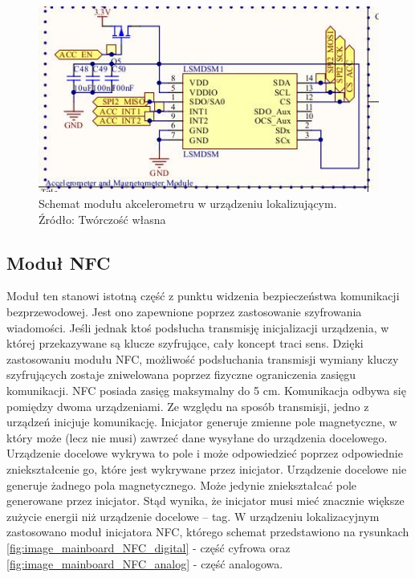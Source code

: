 \begin{figure}[H]
	\centering
	\includegraphics[width=15cm]{img/schematics/mainboard_functional_accelerometer.jpg}
	\caption{Schemat modułu akcelerometru w urządzeniu lokalizującym. \\ Źródło: Twórczość własna}
	\label{fig:image_mainboard_functional_accelerometer}
\end{figure}

\subsection{Moduł NFC}

Moduł ten stanowi istotną część z punktu widzenia bezpieczeństwa komunikacji bezprzewodowej. Jest ono zapewnione poprzez zastosowanie szyfrowania wiadomości. Jeśli jednak ktoś podsłucha transmisję inicjalizacji urządzenia, w której przekazywane są klucze szyfrujące, cały koncept traci sens. Dzięki zastosowaniu modułu NFC, możliwość podsłuchania transmisji wymiany kluczy szyfrujących zostaje zniwelowana poprzez fizyczne ograniczenia zasięgu komunikacji. NFC posiada zasięg maksymalny do 5 cm.
Komunikacja odbywa się pomiędzy dwoma urządzeniami. Ze względu na sposób transmisji, jedno z urządzeń inicjuje komunikację. Inicjator generuje zmienne pole magnetyczne, w który może (lecz nie musi) zawrzeć dane wysyłane do urządzenia docelowego. Urządzenie docelowe wykrywa to pole i może odpowiedzieć poprzez odpowiednie zniekształcenie go, które jest wykrywane przez inicjator. Urządzenie docelowe nie generuje żadnego pola magnetycznego. Może jedynie zniekształcać pole generowane przez inicjator. Stąd wynika, że inicjator musi mieć znacznie większe zużycie energii niż urządzenie docelowe – tag. W urządzeniu lokalizacyjnym zastosowano moduł inicjatora NFC, którego schemat przedstawiono na rysunkach \ref{fig:image_mainboard_NFC_digital} - część cyfrowa oraz \ref{fig:image_mainboard_NFC_analog} - część analogowa.

